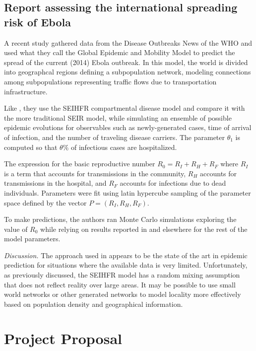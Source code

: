 \documentclass[10pt, journal,onecolumn]{IEEEtran}
\begin{document}
\subsection{\textbf{Report assessing the international spreading risk of Ebola \citep{gomes2014assessing}}}

A recent study \citep{gomes2014assessing} gathered data from the Disease Outbreaks News of
the WHO and used what they call the Global Epidemic and Mobility Model to predict the spread of the
current (2014) Ebola outbreak. In this model, the world is divided into geographcal regions defining a
subpopulation network, modeling connections among subpopulations representing traffic flows due to
transportation infrastructure.

Like \citep{legrand2007understanding}, they use the SEIHFR compartmental disease model and compare
it with the more traditional SEIR model, while simulating
an ensemble of possible epidemic evolutions for observables such as newly-generated
cases, time of arrival of infection, and the number of traveling disease carriers.
The parameter $\theta_1$ is computed so that $\theta\%$ of infectious cases
are hospitalized.

The expression for the basic reproductive number $R_0 = R_I + R_H + R_F$
where $R_I$ is a term that accounts for transmissions in the community, $R_H$ accounts for
transmissions in the hospital, and $R_F$ accounts for infections due to dead individuals.
Parameters were fit using latin hypercube sampling of the parameter space defined by the
vector $P = (R_I, R_H, R_F)$.

To make predictions, the authors ran Monte Carlo simulations exploring the value of $R_0$ while relying on results reported
in \citep{legrand2007understanding} and elsewhere for the rest of the model parameters.

\textit{Discussion.} The approach used in \citep{legrand2007understanding} appears to be the state of the art in epidemic prediction for
situations where the available data is very limited. Unfortunately, as previously discussed, the
SEIHFR model has a random mixing assumption that does not reflect reality over large areas.
It may be possible to use small world networks or other generated networks to model locality
more effectively based on population density and geographical information.



\section{Project Proposal}
\label{sec:ProjectProposal}
\end{document}
